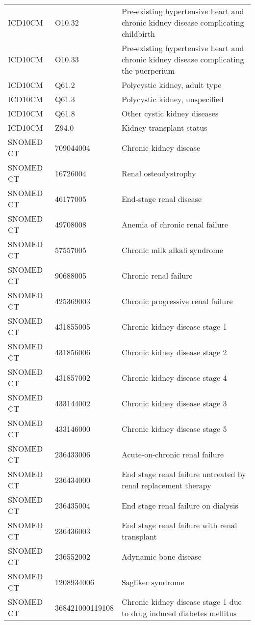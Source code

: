 \begin{longtable}{p{}p{}p{}}
  ICD10CM & O10.32 & Pre-existing hypertensive heart and chronic kidney disease complicating childbirth \\ 
  ICD10CM & O10.33 & Pre-existing hypertensive heart and chronic kidney disease complicating the puerperium \\ 
  ICD10CM & Q61.2 & Polycystic kidney, adult type \\ 
  ICD10CM & Q61.3 & Polycystic kidney, unspecified \\ 
  ICD10CM & Q61.8 & Other cystic kidney diseases \\ 
  ICD10CM & Z94.0 & Kidney transplant status \\ 
  SNOMED CT & 709044004 & Chronic kidney disease \\ 
  SNOMED CT & 16726004 & Renal osteodystrophy \\ 
  SNOMED CT & 46177005 & End-stage renal disease \\ 
  SNOMED CT & 49708008 & Anemia of chronic renal failure \\ 
  SNOMED CT & 57557005 & Chronic milk alkali syndrome \\ 
  SNOMED CT & 90688005 & Chronic renal failure \\ 
  SNOMED CT & 425369003 & Chronic progressive renal failure \\ 
  SNOMED CT & 431855005 & Chronic kidney disease stage 1 \\ 
  SNOMED CT & 431856006 & Chronic kidney disease stage 2 \\ 
  SNOMED CT & 431857002 & Chronic kidney disease stage 4 \\ 
  SNOMED CT & 433144002 & Chronic kidney disease stage 3 \\ 
  SNOMED CT & 433146000 & Chronic kidney disease stage 5 \\ 
  SNOMED CT & 236433006 & Acute-on-chronic renal failure \\ 
  SNOMED CT & 236434000 & End stage renal failure untreated by renal replacement therapy \\ 
  SNOMED CT & 236435004 & End stage renal failure on dialysis \\ 
  SNOMED CT & 236436003 & End stage renal failure with renal transplant \\ 
  SNOMED CT & 236552002 & Adynamic bone disease \\ 
  SNOMED CT & 1208934006 & Sagliker syndrome \\ 
  SNOMED CT & 368421000119108 & Chronic kidney disease stage 1 due to drug induced diabetes mellitus \\ 

\end{longtable}
